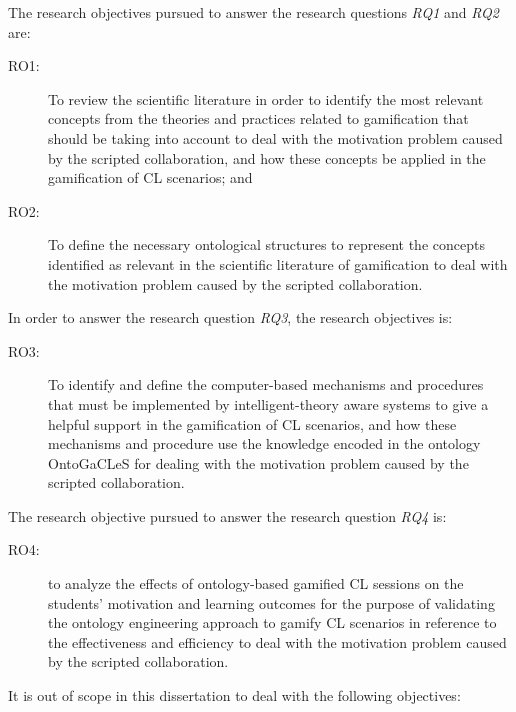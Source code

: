 The research objectives pursued to answer the research questions \emph{RQ1} and \emph{RQ2} are:

\begin{description}
\item[RO1:]
To review the scientific literature in order to identify the most relevant concepts from the theories and practices related to gamification that should be taking into account to deal with the motivation problem caused by the scripted collaboration, and how these concepts be applied in the gamification of CL scenarios; and

\item[RO2:]
To define the necessary ontological structures to represent the concepts identified as relevant in the scientific literature of gamification to deal with the motivation problem caused by the scripted collaboration.
\end{description}


In order to answer the research question \emph{RQ3}, the research objectives is:

\begin{description}
\item[RO3:]
To identify and define the computer-based mechanisms and procedures that must be implemented by intelligent-theory aware systems to give a helpful support in the gamification of CL scenarios, and how these mechanisms and procedure use the knowledge encoded in the ontology OntoGaCLeS for dealing with the motivation problem caused by the scripted collaboration.
\end{description}

The research objective pursued to answer the research question \emph{RQ4} is:

\begin{description}
\item[RO4:]
to analyze the effects of ontology-based gamified CL sessions on the students’ motivation and learning outcomes for the purpose of validating the ontology engineering approach to gamify CL scenarios in reference to the effectiveness and efficiency to deal with the motivation problem caused by the scripted collaboration.
\end{description}

It is out of scope in this dissertation to deal with the following objectives:

